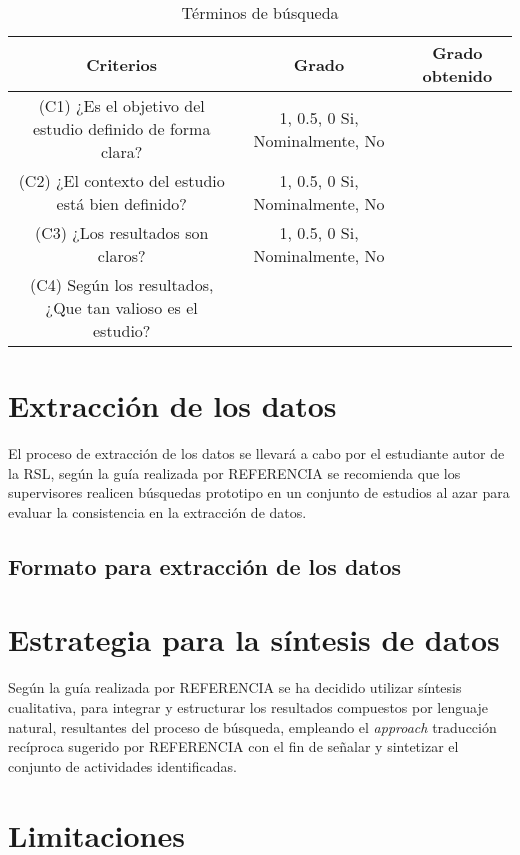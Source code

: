 \documentclass{article}
\begin{document}
\begin{table}[ht]
        \caption{Términos de búsqueda} 
        \centering 
        \begin{tabular}{c c c}
                \hline
                Criterios & Grado & Grado obtenido\\ [0.5ex]
                \hline 
                (C1) ¿Es el objetivo del estudio definido de forma clara? & {1, 0.5, 0} {Si, Nominalmente, No} \\
                \hline
                (C2) ¿El contexto del estudio está bien definido? & {1, 0.5, 0} {Si, Nominalmente, No} \\
                \hline 
                (C3) ¿Los resultados son claros? & {1, 0.5, 0} {Si, Nominalmente, No} \\
                \hline
                (C4) Según los resultados, ¿Que tan valioso es el estudio? \\
                \hline 
        \end{tabular}
        \label{table:tablaterminos}
\end{table}
\newpage

\section{Extracción de los datos}
El proceso de extracción de los datos se llevará a cabo por el estudiante autor de la RSL, según la guía realizada por REFERENCIA 
se recomienda que los supervisores realicen búsquedas prototipo en un conjunto de estudios al azar para evaluar la consistencia
en la extracción de datos.

\subsection{Formato para extracción de los datos}


\section{Estrategia para la síntesis de datos}
Según la guía realizada por REFERENCIA se ha decidido utilizar síntesis cualitativa, para integrar y estructurar los resultados compuestos por 
lenguaje natural, resultantes del proceso de búsqueda, empleando el \emph{approach} traducción recíproca sugerido por REFERENCIA con el fin de señalar 
y sintetizar el conjunto de actividades identificadas.
\newpage

\section{Limitaciones}
\end{document}
